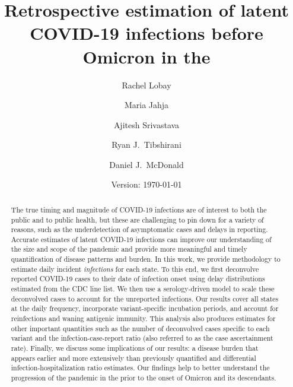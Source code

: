 \documentclass{article}
\begin{document}
\title{Retrospective estimation of latent COVID-19 infections before Omicron in the \US}
\author[a,1]{Rachel Lobay}
\author[b]{Maria Jahja}
\author[c]{Ajitesh Srivastava}
\author[d]{Ryan J.\ Tibshirani}
\author[a]{Daniel J.\ McDonald}





\date{Version: \today}
\maketitle

\begin{abstract}
The true timing and magnitude of COVID-19 infections are of interest to both the
public and to public health, but these are challenging to pin down for a variety of 
reasons, such as the underdetection of asymptomatic cases and delays in reporting.
Accurate estimates of latent COVID-19
infections can improve our understanding of the size and scope of the pandemic
and provide more meaningful and timely quantification of disease patterns and
burden. In this work, we provide methodology to 
estimate daily incident \emph{infections} for each \US
state. To this end, we first deconvolve reported COVID-19 cases to their date of
infection onset using delay distributions estimated from the CDC line list. We
then use a serology-driven model to scale these deconvolved cases to account for
the unreported infections. Our results cover all states at the daily frequency,
incorporate variant-specific incubation periods, and account for reinfections
and waning antigenic immunity. This analysis also produces estimates for other
important quantities such as the number of deconvolved cases specific to each
variant and the infection-case-report ratio (also referred to as the case 
ascertainment rate). Finally, we discuss some implications of our results: 
a disease burden that appears earlier and more
extensively than previously quantified and differential infection-hospitalization
ratio estimates. Our findings help to better understand the progression of the 
pandemic in the \US prior to the onset of Omicron and its descendants. 

\end{abstract}
\end{document}
